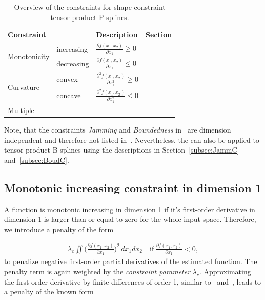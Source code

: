 \begin{table}[H]
	\centering
	\begin{tabular}{|l|ll|l|}
		\hline
		\textbf{Constraint}& & \textbf{Description}   & \textbf{Section}     \\ \hline \toprule
		\multirow{2}{*}{Monotonicity} & increasing & $ \frac{\partial f(x_1,x_2)}{\partial x_1} \ge 0$ 	& \pref{subsec:MIC-TP-one-dim} \\ \cline{2-4}
		& decreasing & $\frac{\partial f(x_1,x_2)}{\partial x_1} \le 0$  & \pref{subsec:MDC-TP-one-dim} \\ \hline	
		\multirow{2}{*}{Curvature}    & convex     & $\frac{\partial^2 f(x_1,x_2)}{\partial x_1^2}\ge 0$ 	& \pref{subsec:CONV-TP-one-dim} \\ \cline{2-4}
		& concave    & $\frac{\partial^2 f(x_1,x_2)}{\partial x_1^2}\le 0$ 	& \pref{subsec:CONC-TP-one-dim} \\ \hline 
		Multiple  & & & \pref{subsec:MULTICON-TP-one-dim} \\ \hline \bottomrule
	\end{tabular}
	\caption{Overview of the constraints for shape-constraint tensor-product P-splines.}
	\label{tab:constraint_overview_2d}
\end{table}

Note, that the constraints \emph{Jamming} and \emph{Boundedness} in~ are dimension independent and therefore not listed in~. Nevertheless, the can also be applied to tensor-product B-splines using the descriptions in Section~\ref{subsec:JammC} and~\ref{subsec:BoudC}.

\subsection{Monotonic increasing constraint in dimension 1} \label{subsec:MIC-TP-one-dim}

A function is monotonic increasing in dimension 1 if it's first-order derivative in dimension 1 is larger than or equal to zero for the whole input space. Therefore, we introduce a penalty of the form

\begin{align} \label{eq:SCP-tp-penalty-base-from}
	\lambda_c \iint \big( \frac{\partial f(x_1, x_2)}{\partial x_1} \big)^2 \,dx_1 dx_2 \quad \text{if} \ \frac{\partial f(x_1, x_2)}{\partial x_1} < 0,
\end{align} 
%
to penalize negative first-order partial derivatives of the estimated function. The penalty term is again weighted by the \emph{constraint parameter} $\lambda_c$. Approximating the first-order derivative by finite-differences of order 1, similar to~ and~, leads to a penalty of the known form 

